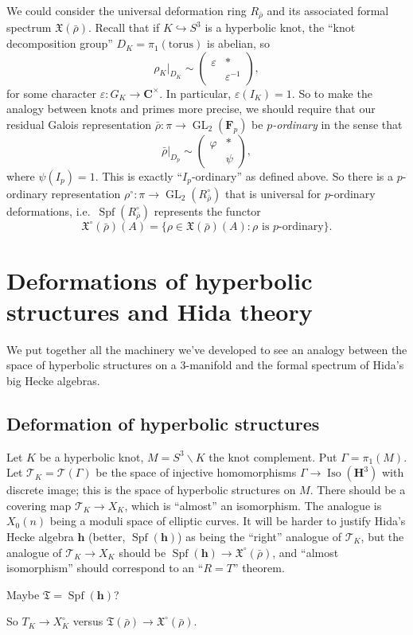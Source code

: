 \documentclass{article}
\DeclareMathOperator{\formalspectrum}{Spf}
\DeclareMathOperator{\GL}{GL}
\DeclareMathOperator{\isometry}{Iso}
\newcommand{\cT}{\mathcal{T}}
\newcommand{\dC}{\mathbf{C}}
\newcommand{\dF}{\mathbf{F}}
\newcommand{\dH}{\mathbf{H}}
\newcommand{\fX}{\mathfrak{X}}
\begin{document}
We could consider the universal deformation ring $R_{\bar\rho}$ and its 
associated formal spectrum $\fX(\bar\rho)$. Recall that if 
$K\hookrightarrow S^3$ is a hyperbolic knot, the ``knot decomposition group'' 
$D_K=\pi_1(\mathrm{torus})$ is abelian, so 
\[
  \rho_K|_{D_K} \sim \begin{pmatrix} \varepsilon & \ast \\ & \varepsilon^{-1} \end{pmatrix} ,
\]
for some character $\varepsilon:G_K\to \dC^\times$. In particular, 
$\varepsilon(I_K)=1$. So to make the analogy between knots and primes more 
precise, we should require that our residual Galois representation 
$\bar\rho:\pi \to \GL_2(\dF_p)$ be \emph{$p$-ordinary} in the sense that 
\[
  \bar\rho|_{D_p} \sim \begin{pmatrix} \varphi & \ast \\ & \psi \end{pmatrix} ,
\]
where $\psi({I_p})=1$. This is exactly ``$I_p$-ordinary'' as defined above. So 
there is a $p$-ordinary representation 
$\rho^\circ:\pi \to \GL_2(R_{\bar\rho}^\circ)$ that is universal for 
$p$-ordinary deformations, 
i.e.~$\formalspectrum(R_{\bar\rho}^\circ)$ represents the 
functor
\[
  \fX^\circ(\bar\rho)(A) = \{\rho\in \fX(\bar\rho)(A):\rho\text{ is $p$-ordinary}\} .
\]





\section{Deformations of hyperbolic structures and Hida theory}

We put together all the machinery we've developed to see an analogy between the 
space of hyperbolic structures on a 3-manifold and the formal spectrum of 
Hida's big Hecke algebras. 


\subsection{Deformation of hyperbolic structures}

Let $K$ be a hyperbolic knot, $M=S^3\smallsetminus K$ the knot complement. Put 
$\Gamma=\pi_1(M)$. Let $\cT_K=\cT(\Gamma)$ be the space of injective 
homomorphisms $\Gamma\to \isometry(\dH^3)$ with discrete image; this is the 
space of hyperbolic structures on $M$. There should be a covering map 
$\cT_K \to X_K$, which is ``almost'' an isomorphism. The analogue is 
$X_0(n)$ being a moduli space of elliptic curves. It will be harder to justify 
Hida's Hecke algebra $\mathbf h$ (better, $\formalspectrum(\mathbf h)$) as 
being the ``right'' analogue of $\cT_K$, but the analogue of 
$\cT_K \to X_K$ should be $\formalspectrum(\mathbf h) \to \fX^\circ(\bar\rho)$, 
and ``almost isomorphism'' should correspond to an ``$R=T$'' theorem. 

Maybe $\mathfrak T = \formalspectrum(\mathbf h)$?

So $T_K\to X_K^\circ$ versus $\mathfrak T(\bar\rho) \to \fX^\circ(\bar\rho)$. 






\end{document}
